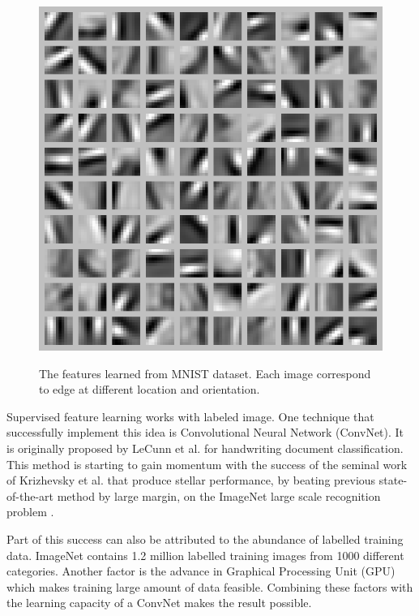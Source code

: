 \documentclass[a4paper,11pt]{kth-mag}
\begin{document}
\begin{figure}[h]
\centering
\includegraphics[scale=0.3]{image/autoencoder.png}
\label{fig:autoencoder}
\caption{The features learned from MNIST dataset. Each image correspond to edge at different location and orientation.}
\end{figure}

Supervised feature learning works with labeled image. One technique that successfully implement this idea is Convolutional Neural Network (ConvNet). It is originally proposed by LeCunn et al. \cite{lecunn1999} for handwriting document classification. This method is starting to gain momentum with the success of the seminal work of Krizhevsky et al. \cite{krizhevsky2012cnn} that produce stellar performance, by beating previous state-of-the-art method by large margin, on the ImageNet large scale recognition problem \cite{imagenet}. 

Part of this success can also be attributed to the abundance of labelled training data. ImageNet contains 1.2 million labelled training images from 1000 different categories. Another factor is the advance in Graphical Processing Unit (GPU) which makes training large amount of data feasible. Combining these factors with the learning capacity of a ConvNet makes the result possible.
\end{document}
